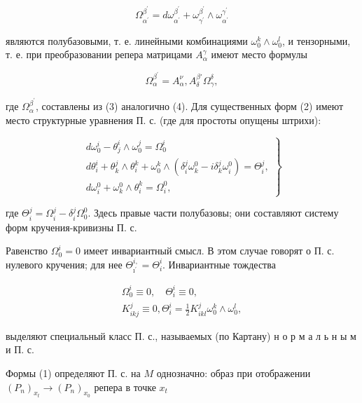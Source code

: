 \documentclass[10pt]{article}
\begin{document}
\[

\Omega_{\alpha^{\prime}}^{\beta^{\prime}}=d \omega_{\alpha^{\prime}}^{\beta^{\prime}}+\omega_{\gamma^{\prime}}^{\beta^{\prime}} \wedge \omega_{\alpha^{\prime}}^{\gamma^{\prime}}

\]



являются полубазовыми, т. е. линейными комбинациями $\omega_{0}^{k} \wedge \omega_{0}^{l}$, и тензорными, т. е. при преобразовании репера матрицами $A_{\alpha}^{\gamma}$ имеют место формулы



\[

\Omega_{\alpha}^{\beta^{\prime}}=A_{\alpha}^{\nu}, A_{\delta}^{\beta \prime} \Omega_{\gamma}^{\delta},

\]



где $\Omega_{\alpha}^{\beta^{\prime}}$, составлены из (3) аналогично (4). Для существенных форм (2) имеют место структурные уравнения П. с. (где для простоты опущены штрихи):



\[

\left.\begin{array}{c}

d \omega_{0}^{i}-\theta_{j}^{i} \wedge \omega_{0}^{j}=\Omega_{0}^{i} \\

d \theta_{i}^{i}+\theta_{k}^{j} \wedge \theta_{i}^{k}+\omega_{0}^{k} \wedge\left(\delta_{i}^{j} \omega_{k}^{0}-i \delta_{k}^{j} \omega_{i}^{0}\right)=\Theta_{i}^{j}, \\

d \omega_{i}^{0}+\omega_{k}^{0} \wedge \theta_{i}^{k}=\Omega_{i}^{0},

\end{array}\right\}

\]



где $\Theta_{i}^{j}=\Omega_{i}^{j}-\delta_{i}^{j} \Omega_{0}^{0}$. Здесь правые части полубазовы; они составляют систему форм кручения-кривизны П. с.



Равенство $\Omega_{0}^{i}=0$ имеет инвариантный смысл. В этом случае говорят о П. с. нулевого кручения; для нее $\Theta_{\imath^{\prime}}^{i,}=\Theta_{i}^{i}$. Инвариантные тождества



\[

\begin{gathered}

\Omega_{0}^{i} \equiv 0, \quad \Theta_{i}^{i} \equiv 0, \\

K_{i k j}^{j} \equiv 0, \Theta_{i}^{i}=\frac{1}{2} K_{i k l}^{j} \omega_{0}^{k} \wedge \omega_{0}^{l},

\end{gathered}

\]



выделяют специальный класс П. с., называемых (по Картану) н о р м а л ь н ы м и П. с.



Формы (1) определяют П. с. на $M$ однозначно: образ при отображении $\left(P_{n}\right)_{x_{t}} \rightarrow\left(P_{n}\right)_{x_{0}}$ репера в точке $x_{t}$
\end{document}
